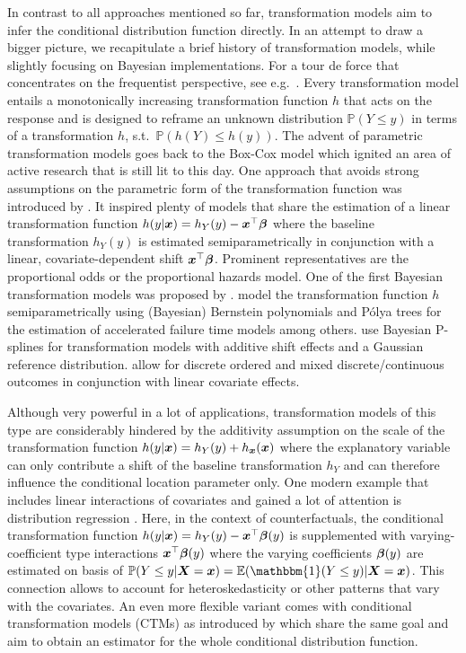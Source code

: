 \documentclass[12pt]{article}
\theoremstyle{plain}
\begin{document}
In contrast to all approaches mentioned so far, transformation models aim to infer the conditional distribution function directly. In an attempt to draw a bigger picture, we recapitulate a brief history of transformation models, while slightly focusing on Bayesian implementations. For a tour de force that concentrates on the frequentist perspective, see e.g.~\cite{hothorn2014,most2015conditional}.
Every transformation model entails a monotonically increasing transformation function $h$ that acts on the response and is designed to reframe an unknown distribution $\mathbb{P}(Y \leq y)$ in terms of a transformation $h$, s.t.~$\mathbb{P}(h(Y) \leq h(y))$. The advent of parametric transformation models goes back to the Box-Cox model \citep{box1964analysis} which ignited an area of active research that is still lit to this day.  One approach that avoids strong assumptions on the parametric form of the transformation function was introduced by \cite{cheng1995analysis}. It inspired plenty of models that share the estimation of a linear transformation function $h(y|\text{\boldmath$x$}) = h_Y(y)- \text{\boldmath$x$}^\top\text{\boldmath$\beta$}$ where the baseline transformation $h_Y(y)$ is estimated semiparametrically in conjunction with a linear, covariate-dependent shift $\text{\boldmath$x$}^\top\text{\boldmath$\beta$}$. Prominent representatives are the proportional odds or the proportional hazards model. One of the first Bayesian transformation models was proposed by \cite{pericchi1981bayesian}. \cite{mallick2003bayesian} model  the transformation function $h$ semiparametrically using (Bayesian) Bernstein polynomials and P\'{o}lya trees for the estimation of accelerated failure time models among others.  \cite{song2012semiparametric} use  Bayesian P-splines \citep{lang2004bayesian} for transformation models with additive shift effects and a Gaussian reference distribution. \cite{james2021bayesian} allow for discrete ordered and mixed discrete/continuous outcomes in conjunction with linear covariate effects.

Although very powerful in a lot of applications, transformation models of this type are considerably hindered by the additivity assumption on the scale of the transformation function $h(y|\text{\boldmath$x$}) = h_Y(y) + h_{\text{\boldmath$x$}}(\text{\boldmath$x$})$ where the explanatory variable can only contribute a shift of the baseline transformation $h_Y$ and can therefore influence the conditional location parameter only.  One modern example that includes linear interactions of covariates and gained a lot of attention is distribution regression \citep{chernozhukov2013inference}. Here, in the context of counterfactuals, the conditional transformation function $h(y|\text{\boldmath$x$})=h_Y(y) - \text{\boldmath$x$}^\top \text{\boldmath$\beta$}(y)$ is supplemented with varying-coefficient type interactions $\text{\boldmath$x$}^\top \text{\boldmath$\beta$}(y)$ where the varying coefficients $\text{\boldmath$\beta$}(y)$ are estimated on basis of $\mathbb{P}(Y \leq y | \mX=\xvec)=\mathbb{E}(\mathbbm{1}(Y\leq y) |\mX=\xvec)$. This connection allows to account for heteroskedasticity or other patterns that vary with the covariates.
An even more flexible variant comes with conditional transformation models (CTMs) as introduced by \cite{hothorn2014} which share the same goal and aim to obtain an estimator for the whole conditional  distribution function.
\end{document}
